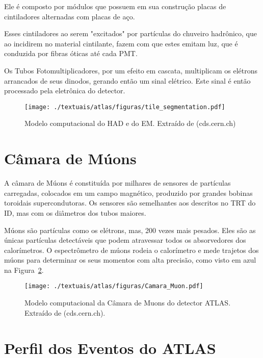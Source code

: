 Ele é composto por módulos que possuem em sua construção placas de cintiladores alternadas com placas de aço.

Esses cintiladores ao serem "excitados" por partículas do chuveiro hadrônico, que ao incidirem no material cintilante, fazem com que estes emitam luz, que é conduzida por fibras óticas até cada \ac{PMT}.

Os Tubos Fotomultiplicadores, por um efeito em cascata, multiplicam os elétrons arrancados de seus dinodos, gerando então um sinal elétrico. Este sinal é então processado pela eletrônica do detector.

\begin{figure}[h!]
	\centering
	\texttt{[image: ./textuais/atlas/figuras/tile\_segmentation.pdf]}\\
	\caption{Modelo computacional do HAD e do EM. Extraído de (cds.cern.ch)}
	\label{fig:3T14}
\end{figure}



\section{Câmara de Múons}

A câmara de Múons é constituída por milhares de sensores de partículas carregadas, colocados em um campo magnético, produzido por grandes bobinas toroidais supercondutoras. Os sensores são semelhantes aos descritos no TRT do ID, mas com os diâmetros dos tubos maiores.

Múons são partículas como os elétrons, mas, 200 vezes mais pesados. Eles são as únicas partículas detectáveis que podem atravessar todos os absorvedores dos calorímetros. O espectrômetro de múons \cite{atlas2010commissioning} rodeia o calorímetro e mede trajetos dos múons para determinar os seus momentos com alta precisão, como visto em azul na Figura~\ref{fig:3T03}.

\begin{figure}[h!]
	\centering
	\texttt{[image: ./textuais/atlas/figuras/Camara\_Muon.pdf]}\\
	\caption{Modelo computacional da Câmara de Muons do detector ATLAS. Extraído de (cds.cern.ch).}
	\label{fig:3T03}
\end{figure}

\section{Perfil dos Eventos do ATLAS}

